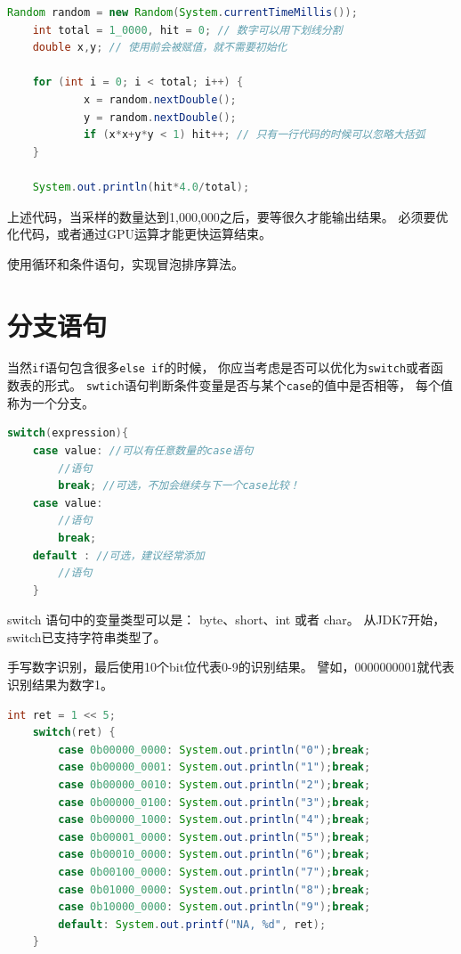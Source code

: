 \begin{lstlisting}[language=Java]
	Random random = new Random(System.currentTimeMillis());
	int total = 1_0000, hit = 0; // 数字可以用下划线分割
	double x,y; // 使用前会被赋值，就不需要初始化

	for (int i = 0; i < total; i++) {
			x = random.nextDouble();
			y = random.nextDouble();
			if (x*x+y*y < 1) hit++; // 只有一行代码的时候可以忽略大括弧
	}

	System.out.println(hit*4.0/total);
\end{lstlisting}

\noindent
上述代码，当采样的数量达到1,000,000之后，要等很久才能输出结果。
必须要优化代码，或者通过GPU运算才能更快运算结束。
\bigskip

\begin{exercise}
	使用循环和条件语句，实现冒泡排序算法。
\end{exercise}

\section{分支语句}
当然\lstinline{if}语句包含很多\lstinline{else if}的时候，
你应当考虑是否可以优化为\lstinline{switch}或者函数表的形式。
\lstinline{swtich}语句判断条件变量是否与某个\lstinline{case}的值中是否相等，
每个值称为一个分支。

\begin{lstlisting}[language=Java]
	switch(expression){
	case value: //可以有任意数量的case语句
		//语句
		break; //可选，不加会继续与下一个case比较！
	case value:
		//语句
		break;
	default : //可选，建议经常添加
		//语句
	}
\end{lstlisting}

\noindent
switch 语句中的变量类型可以是： byte、short、int 或者 char。
从JDK7开始，switch已支持字符串类型了。
\bigskip
{}
\bigskip

\begin{example}
	手写数字识别，最后使用10个bit位代表0-9的识别结果。
	譬如，0000000001就代表识别结果为数字1。
\end{example}

\begin{lstlisting}[language=Java]
	int ret = 1 << 5;
	switch(ret) {
		case 0b00000_0000: System.out.println("0");break;
		case 0b00000_0001: System.out.println("1");break;
		case 0b00000_0010: System.out.println("2");break;
		case 0b00000_0100: System.out.println("3");break;
		case 0b00000_1000: System.out.println("4");break;
		case 0b00001_0000: System.out.println("5");break;
		case 0b00010_0000: System.out.println("6");break;
		case 0b00100_0000: System.out.println("7");break;
		case 0b01000_0000: System.out.println("8");break;
		case 0b10000_0000: System.out.println("9");break;
		default: System.out.printf("NA, %d", ret);
	}
\end{lstlisting}

